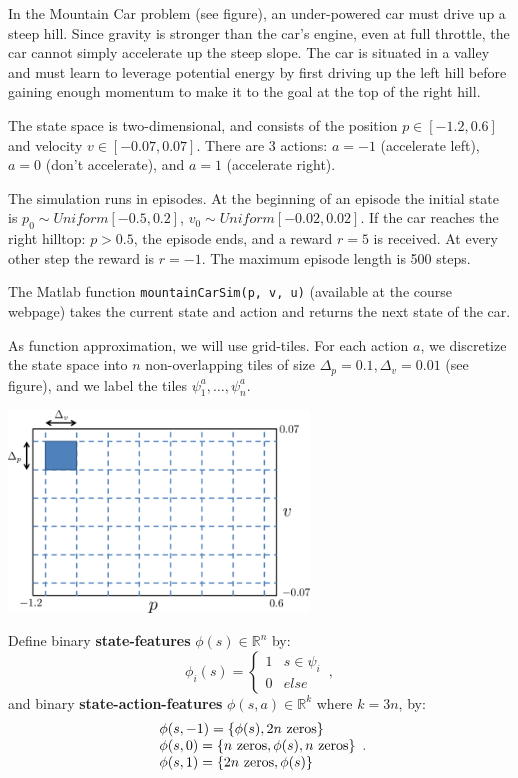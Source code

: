 \begin{exercise}
In the Mountain Car problem (see figure), an under-powered car must drive up a steep hill. Since gravity is stronger than the car's engine, even at full throttle, the car cannot simply accelerate up the steep slope. The car is situated in a valley and must learn to leverage potential energy by first driving up the left hill before gaining enough momentum to make it to the goal at the top of the right hill.

The state space is two-dimensional, and consists of the position $p \in \left[ { - 1.2,0.6} \right]$ and velocity $v \in \left[ { - 0.07,0.07} \right]$. There are 3 actions: $a =  - 1$ (accelerate left), $a = 0$ (don't accelerate), and $a = 1$ (accelerate right).

The simulation runs in episodes. At the beginning of an episode the initial state is ${p_0}\sim Uniform\left[ { - 0.5,0.2} \right]$, ${v_0}\sim Uniform\left[ { - 0.02,0.02} \right]$. If the car reaches the right hilltop: $p > 0.5$, the episode ends, and a reward $r = 5$ is received. At every other step the reward is $r =  - 1$. The maximum episode length is 500 steps.

The Matlab function \texttt{mountainCarSim(p, v, u)} (available at the course webpage) takes the current state and action and returns the next state of the car.

As function approximation, we will use grid-tiles. For each action $a$, we discretize the state space into $n$ non-overlapping tiles of size ${\Delta _p} = 0.1,{\Delta _v} = 0.01$ (see figure), and we label the tiles $\psi _1^a, \ldots ,\psi _n^a$.
\begin{center}
\includegraphics[width=0.6\textwidth]{hw8_c}
\end{center}

Define binary \textbf{state-features} $\phi(s)\in \mathbb R^n$  by:
\[{\phi _i}(s) = \left\{ {\begin{array}{*{20}{c}}
1&{s \in {\psi _i}\,}\\
0&{else}
\end{array}} \right.,\]
and binary \textbf{state-action-features} $\phi(s,a)\in \mathbb R^k$  where $k = 3n$,  by:
\[\begin{array}{l}
\phi (s, - 1) = \left\{ {\phi (s),2n\,\,{\rm{zeros}}} \right\}\\
\phi (s,0) = \left\{ {n\,\,{\rm{zeros}},\phi (s),n\,\,{\rm{zeros}}} \right\}\\
\phi (s,1) = \left\{ {2n\,\,{\rm{zeros}},\phi (s)} \right\}
\end{array}.\]


\end{exercise}
